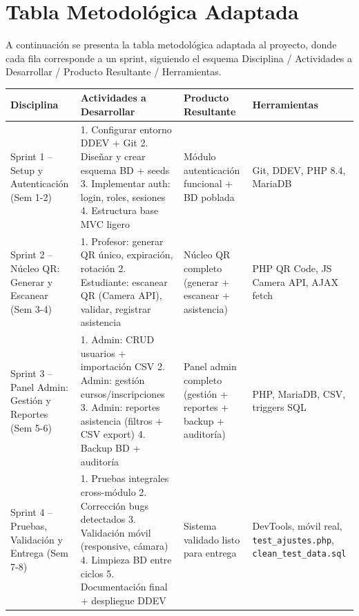 \documentclass[12pt, letterpaper, oneside]{report}
\begin{document}
\section{Tabla Metodol\'ogica Adaptada}

A continuaci\'on se presenta la tabla metodol\'ogica adaptada al proyecto, donde cada fila corresponde a un sprint, siguiendo el esquema Disciplina / Actividades a Desarrollar / Producto Resultante / Herramientas.

\begin{center}
\small
\begin{tabularx}{\textwidth}{|p{2.5cm}|X|X|X|}
\hline
\textbf{Disciplina} & \textbf{Actividades a Desarrollar} & \textbf{Producto Resultante} & \textbf{Herramientas} \\
\hline
Sprint 1 -- Setup y Autenticaci\'on (Sem 1-2) &
1. Configurar entorno DDEV + Git
2. Dise\~nar y crear esquema BD + seeds
3. Implementar auth: login, roles, sesiones
4. Estructura base MVC ligero &
M\'odulo autenticaci\'on funcional + BD poblada &
Git, DDEV, PHP 8.4, MariaDB \\
\hline
Sprint 2 -- N\'ucleo QR: Generar y Escanear (Sem 3-4) &
1. Profesor: generar QR \'unico, expiraci\'on, rotaci\'on
2. Estudiante: escanear QR (Camera API), validar, registrar asistencia &
N\'ucleo QR completo (generar + escanear + asistencia) &
PHP QR Code, JS Camera API, AJAX fetch \\
\hline
Sprint 3 -- Panel Admin: Gesti\'on y Reportes (Sem 5-6) &
1. Admin: CRUD usuarios + importaci\'on CSV
2. Admin: gesti\'on cursos/inscripciones
3. Admin: reportes asistencia (filtros + CSV export)
4. Backup BD + auditor\'ia &
Panel admin completo (gesti\'on + reportes + backup + auditor\'ia) &
PHP, MariaDB, CSV, triggers SQL \\
\hline
Sprint 4 -- Pruebas, Validaci\'on y Entrega (Sem 7-8) &
1. Pruebas integrales cross-m\'odulo
2. Correcci\'on bugs detectados
3. Validaci\'on m\'ovil (responsive, c\'amara)
4. Limpieza BD entre ciclos
5. Documentaci\'on final + despliegue DDEV &
Sistema validado listo para entrega &
DevTools, m\'ovil real, \texttt{test\_ajustes.php}, \texttt{clean\_test\_data.sql} \\
\hline
\end{tabularx}
\end{center}

\newpage

\end{document}
